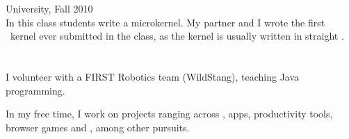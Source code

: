 \begin{resume}

\section{}
University, Fall 2010\\
In this class students write a microkernel. My partner and I wrote the first
\kw{\Cplusplus}\ kernel ever submitted in the class, as the kernel is
usually written in straight .




\section{}
I volunteer with a FIRST Robotics team (WildStang), teaching Java programming.

In my free time,
I work on projects ranging across ,
 apps, productivity tools, browser games and , among
other pursuits.

\begin{formatb}
  \\
  \body\\
\end{formatb}


\end{resume}
